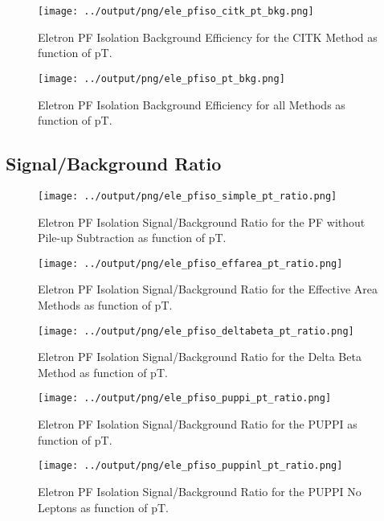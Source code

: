 \documentclass[11pt]{book}
\begin{document}
\begin{figure}[htb]
\centering
\texttt{[image: ../output/png/ele\_pfiso\_citk\_pt\_bkg.png]}
\caption{Eletron PF Isolation Background Efficiency for the CITK Method as function of pT.}
\label{fig:ele_pfiso_pt_bkg_citk}
\end{figure}

\begin{figure}[htb]
\centering
\texttt{[image: ../output/png/ele\_pfiso\_pt\_bkg.png]}
\caption{Eletron PF Isolation Background Efficiency for all Methods as function of pT.}
\label{fig:ele_pfiso_pt_bkg}
\end{figure}
\clearpage


\subsection{Signal/Background Ratio}
\begin{figure}[htb]
\centering
\texttt{[image: ../output/png/ele\_pfiso\_simple\_pt\_ratio.png]}
\caption{Eletron PF Isolation Signal/Background Ratio for the PF without Pile-up Subtraction as function of pT.}
\label{fig:ele_pfiso_pt_ratio_simple}
\end{figure}

\begin{figure}[htb]
\centering
\texttt{[image: ../output/png/ele\_pfiso\_effarea\_pt\_ratio.png]}
\caption{Eletron PF Isolation Signal/Background Ratio for the Effective Area Methods as function of pT.}
\label{fig:ele_pfiso_pt_ratio_effarea}
\end{figure}

\begin{figure}[htb]
\centering
\texttt{[image: ../output/png/ele\_pfiso\_deltabeta\_pt\_ratio.png]}
\caption{Eletron PF Isolation Signal/Background Ratio for the Delta Beta Method as function of pT.}
\label{fig:ele_pfiso_pt_ratio_deltabeta}
\end{figure}

\begin{figure}[htb]
\centering
\texttt{[image: ../output/png/ele\_pfiso\_puppi\_pt\_ratio.png]}
\caption{Eletron PF Isolation Signal/Background Ratio for the PUPPI as function of pT.}
\label{fig:ele_pfiso_pt_ratio_puppi}
\end{figure}

\begin{figure}[htb]
\centering
\texttt{[image: ../output/png/ele\_pfiso\_puppinl\_pt\_ratio.png]}
\caption{Eletron PF Isolation Signal/Background Ratio for the PUPPI No Leptons as function of pT.}
\label{fig:ele_pfiso_pt_ratio_puppinl}
\end{figure}
\end{document}
